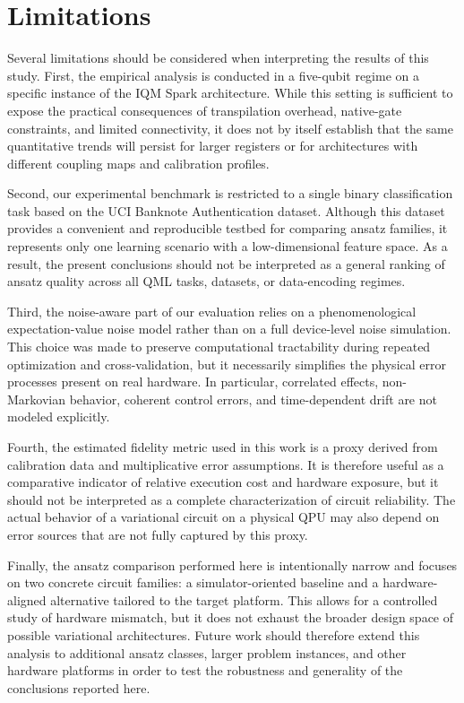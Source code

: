 \documentclass[11pt]{article}
\begin{document}
\section{Limitations}

Several limitations should be considered when interpreting the results of this study. First, the empirical analysis is conducted in a five-qubit regime on a specific instance of the IQM Spark architecture. While this setting is sufficient to expose the practical consequences of transpilation overhead, native-gate constraints, and limited connectivity, it does not by itself establish that the same quantitative trends will persist for larger registers or for architectures with different coupling maps and calibration profiles.

Second, our experimental benchmark is restricted to a single binary classification task based on the UCI Banknote Authentication dataset. Although this dataset provides a convenient and reproducible testbed for comparing ansatz families, it represents only one learning scenario with a low-dimensional feature space. As a result, the present conclusions should not be interpreted as a general ranking of ansatz quality across all QML tasks, datasets, or data-encoding regimes.

Third, the noise-aware part of our evaluation relies on a phenomenological expectation-value noise model rather than on a full device-level noise simulation. This choice was made to preserve computational tractability during repeated optimization and cross-validation, but it necessarily simplifies the physical error processes present on real hardware. In particular, correlated effects, non-Markovian behavior, coherent control errors, and time-dependent drift are not modeled explicitly.

Fourth, the estimated fidelity metric used in this work is a proxy derived from calibration data and multiplicative error assumptions. It is therefore useful as a comparative indicator of relative execution cost and hardware exposure, but it should not be interpreted as a complete characterization of circuit reliability. The actual behavior of a variational circuit on a physical QPU may also depend on error sources that are not fully captured by this proxy.

Finally, the ansatz comparison performed here is intentionally narrow and focuses on two concrete circuit families: a simulator-oriented baseline and a hardware-aligned alternative tailored to the target platform. This allows for a controlled study of hardware mismatch, but it does not exhaust the broader design space of possible variational architectures. Future work should therefore extend this analysis to additional ansatz classes, larger problem instances, and other hardware platforms in order to test the robustness and generality of the conclusions reported here.
\end{document}
